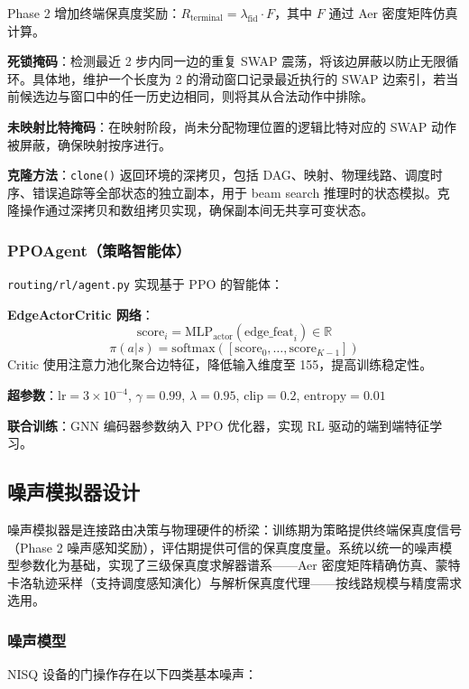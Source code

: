 Phase 2 增加终端保真度奖励：$R_{\text{terminal}} = \lambda_{\text{fid}} \cdot F$，其中 $F$ 通过 Aer 密度矩阵仿真计算。

\textbf{死锁掩码}：检测最近 2 步内同一边的重复 SWAP 震荡，将该边屏蔽以防止无限循环。具体地，维护一个长度为 2 的滑动窗口记录最近执行的 SWAP 边索引，若当前候选边与窗口中的任一历史边相同，则将其从合法动作中排除。

\textbf{未映射比特掩码}：在映射阶段，尚未分配物理位置的逻辑比特对应的 SWAP 动作被屏蔽，确保映射按序进行。

\textbf{克隆方法}：\texttt{clone()} 返回环境的深拷贝，包括 DAG、映射、物理线路、调度时序、错误追踪等全部状态的独立副本，用于 beam search 推理时的状态模拟。克隆操作通过深拷贝和数组拷贝实现，确保副本间无共享可变状态。

\subsubsection{PPOAgent（策略智能体）}

\texttt{routing/rl/agent.py} 实现基于 PPO 的智能体：

\textbf{EdgeActorCritic 网络}：
\[
\text{score}_i = \text{MLP}_{\text{actor}}(\text{edge\_feat}_i) \in \mathbb{R}
\]
\[
\pi(a|s) = \text{softmax}([\text{score}_0, \ldots, \text{score}_{K-1}])
\]
Critic 使用注意力池化聚合边特征，降低输入维度至 155，提高训练稳定性。

\textbf{超参数}：$\text{lr}=3\times10^{-4}$, $\gamma=0.99$, $\lambda=0.95$, $\text{clip}=0.2$, $\text{entropy}=0.01$

\textbf{联合训练}：GNN 编码器参数纳入 PPO 优化器，实现 RL 驱动的端到端特征学习。

\subsection{噪声模拟器设计}
\label{sec:noise-simulator}

噪声模拟器是连接路由决策与物理硬件的桥梁：训练期为策略提供终端保真度信号（Phase 2 噪声感知奖励），评估期提供可信的保真度度量。系统以统一的噪声模型参数化为基础，实现了三级保真度求解器谱系——Aer 密度矩阵精确仿真、蒙特卡洛轨迹采样（支持调度感知演化）与解析保真度代理——按线路规模与精度需求选用。

\subsubsection{噪声模型}

NISQ 设备的门操作存在以下四类基本噪声：

